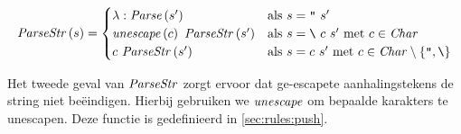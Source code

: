 $$
	\mathit{ParseStr}\left(s\right) =
		\begin{cases}
			\lambda:\mathit{Parse}\left(s'\right) & \text{als $s=\texttt{"}~s'$} \\
			\mathit{unescape}\left(c\right)~\mathit{ParseStr}\left(s'\right) & \text{als $s=\texttt{\textbackslash}~c~s'$
				met $c \in\mathit{Char}$} \\
			c~\mathit{ParseStr}\left(s'\right) & \text{als $s=c~s'$ met $c
				\in\mathit{Char}\setminus\{\texttt{"},\texttt{\textbackslash}\}$}\\
		\end{cases}
$$

Het tweede geval van $\mathit{ParseStr}$ zorgt ervoor dat ge-escapete
aanhalingstekens de string niet beëindigen. Hierbij gebruiken we $\mathit{unescape}$
om bepaalde karakters te unescapen. Deze functie is gedefinieerd in
\autoref{sec:rules:push}.
